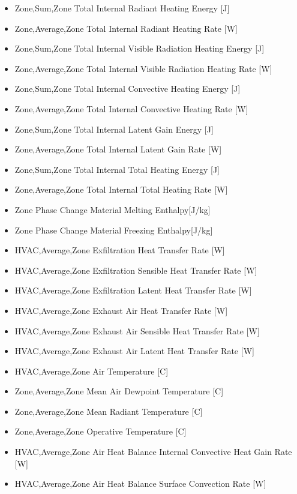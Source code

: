 \begin{itemize}
\item
  Zone,Sum,Zone Total Internal Radiant Heating Energy {[}J{]}
\item
  Zone,Average,Zone Total Internal Radiant Heating Rate {[}W{]}
\item
  Zone,Sum,Zone Total Internal Visible Radiation Heating Energy {[}J{]}
\item
  Zone,Average,Zone Total Internal Visible Radiation Heating Rate {[}W{]}
\item
  Zone,Sum,Zone Total Internal Convective Heating Energy {[}J{]}
\item
  Zone,Average,Zone Total Internal Convective Heating Rate {[}W{]}
\item
  Zone,Sum,Zone Total Internal Latent Gain Energy {[}J{]}
\item
  Zone,Average,Zone Total Internal Latent Gain Rate {[}W{]}
\item
  Zone,Sum,Zone Total Internal Total Heating Energy {[}J{]}
\item
  Zone,Average,Zone Total Internal Total Heating Rate {[}W{]}
 \item
  Zone Phase Change Material Melting Enthalpy{[{J/kg}]}
 \item
  Zone Phase Change Material Freezing Enthalpy{[{J/kg}]}
\item
  HVAC,Average,Zone Exfiltration Heat Transfer Rate {[}W{]}
\item
  HVAC,Average,Zone Exfiltration Sensible Heat Transfer Rate {[}W{]}
\item
  HVAC,Average,Zone Exfiltration Latent Heat Transfer Rate {[}W{]}
\item
  HVAC,Average,Zone Exhaust Air Heat Transfer Rate {[}W{]}
\item
  HVAC,Average,Zone Exhaust Air Sensible Heat Transfer Rate {[}W{]}
\item
  HVAC,Average,Zone Exhaust Air Latent Heat Transfer Rate {[}W{]}
\item
  HVAC,Average,Zone Air Temperature {[}C{]}
\item
  Zone,Average,Zone Mean Air Dewpoint Temperature {[}C{]}
\item
  Zone,Average,Zone Mean Radiant Temperature {[}C{]}
\item
  Zone,Average,Zone Operative Temperature {[}C{]}
\item
  HVAC,Average,Zone Air Heat Balance Internal Convective Heat Gain Rate {[}W{]}
\item
  HVAC,Average,Zone Air Heat Balance Surface Convection Rate {[}W{]}

\end{itemize}

